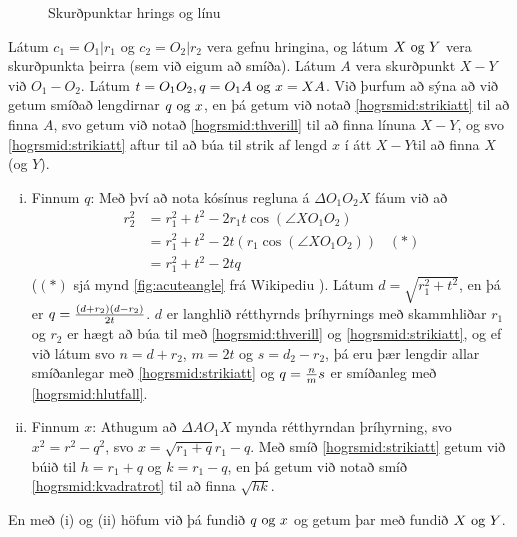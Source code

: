 \begin{frame}
  \begin{figure}[H]
    \centering

    \caption{Skurðpunktar hrings og línu}
    \label{fig:hogrskphringsoglinu}
  \end{figure}
\end{frame}

\begin{frame}[allowframebreaks]
  \begin{hogrsmid}\label{hogrsmid:skphringja}
    Látum \(c_1 = O_1|r_1\) og \(c_2 = O_2|r_2\) vera gefnu hringina, og látum
    \(X \text{ og } Y\) vera skurðpunkta þeirra (sem við eigum að smíða).
    Látum \(A\) vera skurðpunkt \(X-Y\) við \(O_1-O_2\).
    Látum \(t = O_1O_2, q = O_1A \text{ og } x = XA\).
    Við þurfum að sýna að við getum smíðað lengdirnar \(q \text{ og } x\),
    en þá getum við notað \ref{hogrsmid:strikiatt} til að finna \(A\),
    svo getum við notað \ref{hogrsmid:thverill} til að finna línuna \(X-Y\),
    og svo \ref{hogrsmid:strikiatt} aftur til að
    búa til strik af lengd \(x\) í átt \(X-Y\)til að finna \(X\) (og \(Y\)).
  \end{hogrsmid}
  
    \begin{enumerate}[(i)]
      \item Finnum \(q\):
        Með því að nota kósínus regluna \cite{WikiCos} á
        \(\Delta O_1O_2X\) fáum við að
        \begin{align*}
          r_2^2 & = r_1^2 + t^2 - 2r_1 t \cos{(\angle XO_1O_2)}\\
                & = r_1^2 + t^2 - 2t(r_1  \cos{(\angle XO_1O_2)}) \;\;\;(*)\\
                & = r_1^2 + t^2 - 2tq
        \end{align*}
        (\((*)\)
        sjá mynd \ref{fig:acuteangle} frá Wikipediu \cite{WikiCos}).
        Látum \(d = \sqrt{r_1^2 + t^2}\),
        en þá er \(q = \frac{(d+r_2)(d-r_2)}{2t}\).
        \(d\)
        er langhlið rétthyrnds þríhyrnings með skammhliðar \(r_1\)
        og \(r_2\)
        er hægt að búa til með \ref{hogrsmid:thverill} og
        \ref{hogrsmid:strikiatt}, og ef við látum svo \(n = d+r_2\),
        \(m = 2t\)
        og \(s = d_2 -r_2\),
        þá eru þær lengdir allar smíðanlegar með
        \ref{hogrsmid:strikiatt} og \(q = \frac{n}{m}s\)
        er smíðanleg með \ref{hogrsmid:hlutfall}.
      \item Finnum \(x\):
        Athugum að \(\Delta AO_1X\)
        mynda rétthyrndan þríhyrning, svo \(x^2 = r^2 - q^2\),
        svo \(x = \sqrt{r_1+q}{r_1-q}\).
        Með smíð \ref{hogrsmid:strikiatt} getum við búið til
        \(h = r_1 +q\)
        og \(k = r_1 - q\),
        en þá getum við notað smíð \ref{hogrsmid:kvadratrot} til að
        finna \(\sqrt{hk}\).

    \end{enumerate}
    En með (i) og (ii) höfum við þá fundið \(q \text{ og } x\) og getum þar með
    fundið \(X \text{ og } Y\).
\end{frame}


